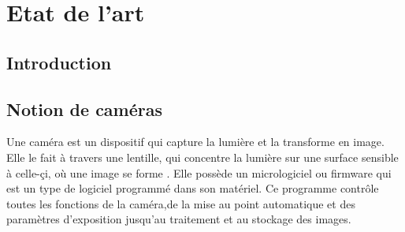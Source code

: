 

\chapter{Etat de l'art} %

\label{Chapter1} %


\newcommand{\keyword}[1]{\textbf{#1}}
\newcommand{\tabhead}[1]{\textbf{#1}}
\newcommand{\code}[1]{\texttt{#1}}
\newcommand{\file}[1]{\texttt{\bfseries#1}}
\newcommand{\option}[1]{\texttt{\itshape#1}}



\section{Introduction}




\newpage
\section{Notion de caméras}

Une caméra est un dispositif qui capture la lumière et la transforme en image. Elle le fait à travers une lentille, qui concentre la lumière sur une surface sensible à celle-çi, où une image se forme \cite{noauthor_quest-ce_nodate}. Elle possède un micrologiciel ou firmware  qui est un type de logiciel programmé dans son matériel. Ce programme contrôle toutes les fonctions de la caméra,de la mise au point automatique et des paramètres d’exposition jusqu’au traitement et au stockage des images.\\

